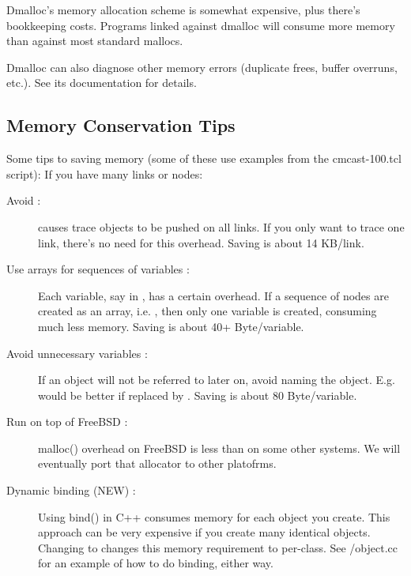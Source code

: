 Dmalloc's memory allocation scheme is somewhat expensive, plus there's
bookkeeping costs. Programs linked against dmalloc will consume more
memory than against most standard mallocs. 

Dmalloc can also diagnose other memory errors (duplicate frees, buffer
overruns, etc.). See its documentation for details. 


\subsection{Memory Conservation Tips}
\label{sec:memconserve}

Some tips to saving memory (some of these use examples from the 
cmcast-100.tcl script): 
If you have many links or nodes: 
\begin{description}
\item[Avoid  :]
 causes trace objects to be pushed on all links. If 
you only want to trace one link, there's no need for this overhead. Saving
is about 14 KB/link. 

\item[Use arrays for sequences of variables :]
Each variable, say  in , has a certain
overhead. If a sequence of nodes are created as an array, i.e.
, then only one variable is created, consuming much less
memory. Saving is about 40+ Byte/variable. 

\item[Avoid unnecessary variables :]
If an object will not be referred to later on, avoid naming the object.
E.g.
would be better if replaced by
.
Saving is about 80 Byte/variable. 

\item[Run on top of FreeBSD :]
malloc() overhead on FreeBSD is less than on some other systems. We will
eventually port that allocator to other platofrms. 

\item[Dynamic binding (NEW) :]
Using bind() in C++ consumes memory for each object you create. This
approach can be very expensive if you create many identical objects.
Changing  to  changes this memory
requirement to per-class. See \ns/object.cc for an example of how to do
binding, either way.
 
\end{description}


